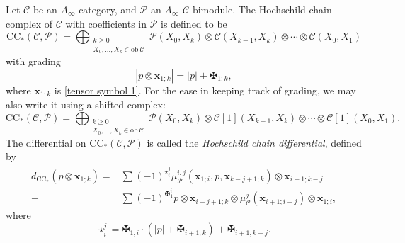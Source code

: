 \documentclass[11pt]{amsproc}
\def\cP{\mathcal{P}}
\def\cc{\mathcal{C}}
\def\r#1{\mathrm{#1}}
\def\ainf{A_\infty}
\def\ob{\mathrm{ob\ }}
\theoremstyle{remark}
\numberwithin{equation}{section}
\begin{document}
Let $\cc$ be an $\ainf$-category, and $\cP$ an $\ainf$ $\cc$-bimodule.
The Hochschild chain complex of $\cc$ with coefficients in $\cP$ is defined to be 
\begin{equation}
\r{CC}_{*}(\cc, \cP) = \bigoplus_{\substack{k \ge 0\\X_{0}, \ldots, X_{k} \in \ob \cc}} \cP(X_{0}, X_{k}) \otimes \cc(X_{k-1}, X_{k}) \otimes \cdots \otimes \cc(X_{0}, X_{1})
\end{equation}
with grading
\begin{equation}
|p \otimes \mathbf{x}_{1; k}| = |p| + \maltese_{1; k},
\end{equation}
where $\mathbf{x}_{1; k}$ is \eqref{tensor symbol 1}.
For the ease in keeping track of grading,
we may also write it using a shifted complex:
\begin{equation}\label{cc shifted form}
\r{CC}_{*}(\cc, \cP) = \bigoplus_{\substack{k \ge 0\\X_{0}, \ldots, X_{k} \in \ob \cc}} \cP(X_{0}, X_{k}) \otimes \cc[1](X_{k-1}, X_{k}) \otimes \cdots \otimes \cc[1](X_{0}, X_{1}).
\end{equation}
The differential on $\r{CC}_{*}(\cc, \cP)$ is called the {\it Hochschild chain differential}, 
defined by
\begin{equation}\label{hochschild chain differential}
\begin{split}
d_{\r{CC}_{*}}(p \otimes \mathbf{x}_{1; k}) = & \sum (-1)^{\star_{i}^{j}} \mu^{i, j}_{\cP}(\mathbf{x}_{1; i}, p, \mathbf{x}_{k-j+1; k})\otimes \mathbf{x}_{i+1; k-j} \\
+ & \sum (-1)^{\maltese_{1}^{i}} p \otimes \mathbf{x}_{i+j+1; k} \otimes \mu^{j}_{\cc}(\mathbf{x}_{i+1; i+j}) \otimes \mathbf{x}_{1; i},
\end{split}
\end{equation}
where 
\begin{equation}
\star_{i}^{j} = \maltese_{1;i} \cdot (|p| + \maltese_{i+1; k}) + \maltese_{i+1; k-j}.
\end{equation}
\end{document}
